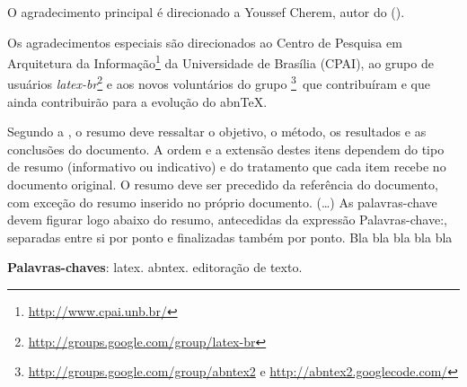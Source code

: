 \documentclass[
12pt,				%
oneside,			%
a4paper,			%
english,			%
french,				%
spanish,			%
brazil,				%
]{abntex2}
\begin{document}
\frenchspacing 


\imprimircapa

\imprimirfolhaderosto*


\begin{agradecimentos}
    O agradecimento principal é direcionado a Youssef Cherem, autor do
     ().

    Os agradecimentos especiais são direcionados ao Centro de Pesquisa em
    Arquitetura da Informação\footnote{\url{http://www.cpai.unb.br/}} da Universidade de
    Brasília (CPAI), ao grupo de usuários
    \emph{latex-br}\footnote{\url{http://groups.google.com/group/latex-br}} e aos
    novos voluntários do grupo
    \emph{\abnTeX}\footnote{\url{http://groups.google.com/group/abntex2} e
    \url{http://abntex2.googlecode.com/}}~que contribuíram e que ainda
    contribuirão para a evolução do abn\TeX.

\end{agradecimentos}


\begin{resumo} %
    Segundo a , o resumo deve ressaltar o
    objetivo, o método, os resultados e as conclusões do documento. A ordem e a extensão
    destes itens dependem do tipo de resumo (informativo ou indicativo) e do
    tratamento que cada item recebe no documento original. O resumo deve ser
    precedido da referência do documento, com exceção do resumo inserido no
    próprio documento. (\ldots) As palavras-chave devem figurar logo abaixo do
    resumo, antecedidas da expressão Palavras-chave:, separadas entre si por
    ponto e finalizadas também por ponto. Bla bla bla bla bla \cite{fulano} %

    \vspace{\onelineskip}

    \noindent
    \textbf{Palavras-chaves}: latex. abntex. editoração de texto.
\end{resumo} %
\end{document}
